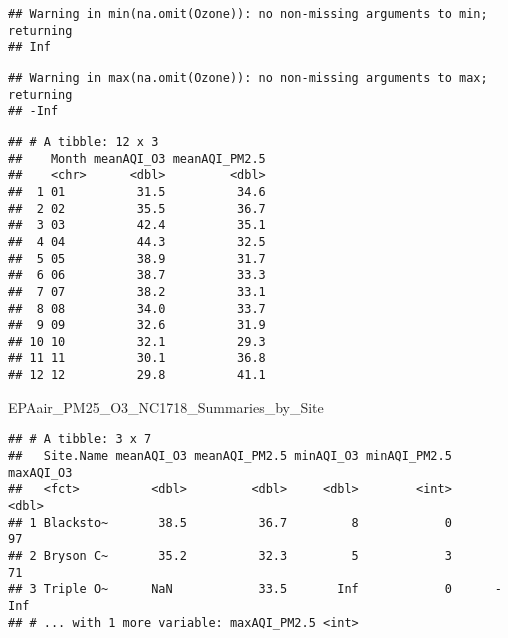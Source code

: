 \documentclass[]{article}
\newenvironment{Shaded}{\begin{snugshade}}{\end{snugshade}}
\newcommand{\CommentTok}[1]{\textcolor[rgb]{0.56,0.35,0.01}{\textit{#1}}}
\newcommand{\NormalTok}[1]{#1}
\begin{document}
\begin{verbatim}
## Warning in min(na.omit(Ozone)): no non-missing arguments to min; returning
## Inf
\end{verbatim}

\begin{verbatim}
## Warning in max(na.omit(Ozone)): no non-missing arguments to max; returning
## -Inf
\end{verbatim}

\begin{Shaded}
\end{Shaded}

\begin{verbatim}
## # A tibble: 12 x 3
##    Month meanAQI_O3 meanAQI_PM2.5
##    <chr>      <dbl>         <dbl>
##  1 01          31.5          34.6
##  2 02          35.5          36.7
##  3 03          42.4          35.1
##  4 04          44.3          32.5
##  5 05          38.9          31.7
##  6 06          38.7          33.3
##  7 07          38.2          33.1
##  8 08          34.0          33.7
##  9 09          32.6          31.9
## 10 10          32.1          29.3
## 11 11          30.1          36.8
## 12 12          29.8          41.1
\end{verbatim}

\begin{Shaded}
\begin{Highlighting}[]
\NormalTok{EPAair_PM25_O3_NC1718_Summaries_by_Site}
\end{Highlighting}
\end{Shaded}

\begin{verbatim}
## # A tibble: 3 x 7
##   Site.Name meanAQI_O3 meanAQI_PM2.5 minAQI_O3 minAQI_PM2.5 maxAQI_O3
##   <fct>          <dbl>         <dbl>     <dbl>        <int>     <dbl>
## 1 Blacksto~       38.5          36.7         8            0        97
## 2 Bryson C~       35.2          32.3         5            3        71
## 3 Triple O~      NaN            33.5       Inf            0      -Inf
## # ... with 1 more variable: maxAQI_PM2.5 <int>
\end{verbatim}
\end{document}
